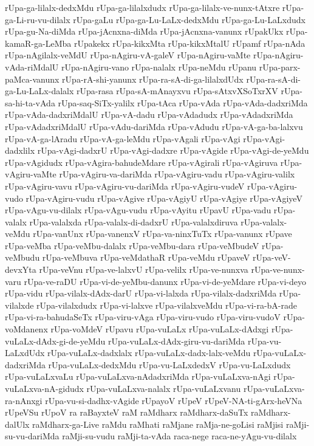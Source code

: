 {rUpa-ga-lilalx-dedxMdu
rUpa-ga-lilalxdudx
rUpa-ga-lilalx-ve-nunx-tAtxre
rUpa-ga-Li-ru-vu-dilalx
rUpa-gaLu
rUpa-ga-Lu-LaLx-dedxMdu
rUpa-ga-Lu-LaLxdudx
rUpa-gu-Na-diMda
rUpa-jAcnxna-diMda
rUpa-jAcnxna-vanunx
rUpakUkx
rUpa-kamaR-ga-LeMba
rUpakekx
rUpa-kikxMta
rUpa-kikxMtalU
rUpamf
rUpa-nAda
rUpa-nAgilalx-veMdU
rUpa-nAgiru-vA-galeV
rUpa-nAgiru-vaMte
rUpa-nAgiru-vAda-riMdalU
rUpa-nAgiru-vano
rUpa-nalalx
rUpa-neMdu
rUpanu
rUpa-parx-paMca-vanunx
rUpa-rA-shi-yanunx
rUpa-ra-sA-di-ga-lilalxdUdx
rUpa-ra-sA-di-ga-Lu-LaLx-dalalx
rUpa-rasa
rUpa-sA-mAnayxvu
rUpa-sAtxvXSoTxrXV
rUpa-sa-hi-ta-vAda
rUpa-saq-SiTx-yalilx
rUpa-tAca
rUpa-vAda
rUpa-vAda-dadxriMda
rUpa-vAda-dadxriMdalU
rUpa-vA-dadu
rUpa-vAdadudx
rUpa-vAdadxriMda
rUpa-vAdadxriMdalU
rUpa-vAdu-dariMda
rUpa-vAdudu
rUpa-vA-ga-ba-lalxvu
rUpa-vA-ga-lAradu
rUpa-vA-ga-leMdu
rUpa-vAgali
rUpa-vAgi
rUpa-vAgi-dadxlilx
rUpa-vAgi-dadxrU
rUpa-vAgi-dadxre
rUpa-vAgide
rUpa-vAgi-de-yeMdu
rUpa-vAgidudx
rUpa-vAgira-bahudeMdare
rUpa-vAgirali
rUpa-vAgiruva
rUpa-vAgiru-vaMte
rUpa-vAgiru-va-dariMda
rUpa-vAgiru-vadu
rUpa-vAgiru-valilx
rUpa-vAgiru-vavu
rUpa-vAgiru-vu-dariMda
rUpa-vAgiru-vudeV
rUpa-vAgiru-vudo
rUpa-vAgiru-vudu
rUpa-vAgive
rUpa-vAgiyU
rUpa-vAgiye
rUpa-vAgiyeV
rUpa-vAgu-vu-dilalx
rUpa-vAgu-vudu
rUpa-vAyitu
rUpavU
rUpa-vadu
rUpa-valalx
rUpa-valalxda
rUpa-valalx-di-dadxrU
rUpa-valalxdiruva
rUpa-valalx-veMdu
rUpa-vanUnx
rUpa-vanenxV
rUpa-va-ninxTuTx
rUpa-vanunx
rUpave
rUpa-veMba
rUpa-veMbu-dalalx
rUpa-veMbu-dara
rUpa-veMbudeV
rUpa-veMbudu
rUpa-veMbuva
rUpa-veMdathaR
rUpa-veMdu
rUpaveV
rUpa-veV-devxYta
rUpa-veVnu
rUpa-ve-lalxvU
rUpa-velilx
rUpa-ve-nunxva
rUpa-ve-nunx-varu
rUpa-ve-raDU
rUpa-vi-de-yeMbu-danunx
rUpa-vi-de-yeMdare
rUpa-vi-deyo
rUpa-vidu
rUpa-vilalx-dAdx-darU
rUpa-vi-lalxda
rUpa-vilalx-dadxriMda
rUpa-vilalxde
rUpa-vilalxdudx
rUpa-vi-lalxve
rUpa-vilalxveMdu
rUpa-vi-ra-bA-rade
rUpa-vi-ra-bahudaSeTx
rUpa-viru-vAga
rUpa-viru-vudo
rUpa-viru-vudoV
rUpa-voMdanenx
rUpa-voMdeV
rUpavu
rUpa-vuLaLx
rUpa-vuLaLx-dAdxgi
rUpa-vuLaLx-dAdx-gi-de-yeMdu
rUpa-vuLaLx-dAdx-giru-vu-dariMda
rUpa-vu-LaLxdUdx
rUpa-vuLaLx-dadxlalx
rUpa-vuLaLx-dadx-lalx-veMdu
rUpa-vuLaLx-dadxriMda
rUpa-vuLaLx-dedxMdu
rUpa-vu-LaLxdedxV
rUpa-vu-LaLxdudx
rUpa-vuLaLxvaLu
rUpa-vuLaLxva-nAdadxriMda
rUpa-vuLaLxva-nAgi
rUpa-vuLaLxva-nA-gidudx
rUpa-vuLaLxva-nalalx
rUpa-vuLaLxvanu
rUpa-vuLaLxva-ra-nAnxgi
rUpa-vu-si-dadhx-vAgide
rUpayoV
rUpeV
rUpeV-NA-ti-gArx-heVNa
rUpeVSu
rUpoV
ra
raBayxteV
raM
raMdharx
raMdharx-daSuTx
raMdharx-dalUlx
raMdharx-ga-Live
raMdu
raMhati
raMjane
raMja-ne-goLisi
raMjisi
raMji-su-vu-dariMda
raMji-su-vudu
raMji-ta-vAda
raca-nege
raca-ne-yAgu-vu-dilalx
}
